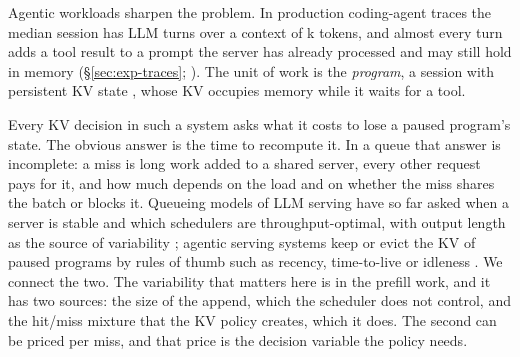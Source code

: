 \documentclass{article}
\theoremstyle{plain}
\theoremstyle{definition}
\theoremstyle{remark}
\begin{document}
Agentic workloads sharpen the problem. In production coding-agent traces
the median session has \wkTurnsMedian{} LLM turns over a context of
\wkContextMedian k tokens, and almost every turn adds a tool result to
a prompt the server has already processed and may still hold in memory
(\S\ref{sec:exp-traces}; \citealp{vllm-agentx}). The unit of work is
the \emph{program}, a session with persistent KV state
\citep{thunderagent}, whose KV occupies memory while it waits for a
tool.

Every KV decision in such a system asks what it costs to lose a
paused program's state. The obvious answer is the time to recompute
it. In a queue that answer is incomplete: a miss is long work added to
a shared server, every other request pays for it, and how much depends
on the load and on whether the miss shares the batch or blocks it.
Queueing models of LLM serving have so far asked when a server is
stable and which schedulers are throughput-optimal, with output length
as the source of variability
\citep{yang2024mg1,dai2025workconserving,ao2025fluid,nie2026stability};
agentic serving systems keep or evict the KV of paused programs by
rules of thumb such as recency, time-to-live or idleness
\citep{li2025continuum,xia2026mori,thunderagent}. We connect the two.
The variability that matters here is in the prefill work, and it has
two sources: the size of the append, which the scheduler does not
control, and the hit/miss mixture that the KV policy creates, which it
does. The second can be priced per miss, and that price is the decision
variable the policy needs.
\end{document}
